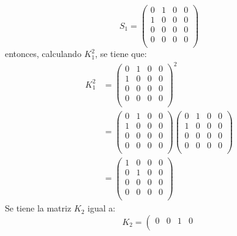 \documentclass[12pt,letterpaper]{report}
\begin{document}
\begin{enumerate}
\begin{equation*}
        S_1 =\left( \begin{matrix}
            0 & 1 & 0 & 0 \\
            1 & 0 & 0 & 0 \\
            0 & 0 & 0 & 0 \\
            0 & 0 & 0 & 0 \\
        \end{matrix}\right)
    \end{equation*}
    entonces, calculando $K_1^2$, se tiene que:
    \begin{align*}
        K_1^2 &=\left( \begin{matrix}
            0 & 1 & 0 & 0 \\
            1 & 0 & 0 & 0 \\
            0 & 0 & 0 & 0 \\
            0 & 0 & 0 & 0 \\
        \end{matrix}\right)^2 \\
        & =\left( \begin{matrix}
            0 & 1 & 0 & 0 \\
            1 & 0 & 0 & 0 \\
            0 & 0 & 0 & 0 \\
            0 & 0 & 0 & 0 \\
        \end{matrix}\right)\left( \begin{matrix}
            0 & 1 & 0 & 0 \\
            1 & 0 & 0 & 0 \\
            0 & 0 & 0 & 0 \\
            0 & 0 & 0 & 0 \\
        \end{matrix}\right)\\
        & =\left( \begin{matrix}
            1 & 0 & 0 & 0 \\
            0 & 1 & 0 & 0 \\
            0 & 0 & 0 & 0 \\
            0 & 0 & 0 & 0 \\
        \end{matrix}\right)
    \end{align*}
    Se tiene la matriz $K_2$ igual a:
    \begin{equation*}
        K_2 =\left( \begin{matrix}
            0 & 0 & 1 & 0 \\

\end{matrix}
\end{equation*}
\end{enumerate}
\end{document}
